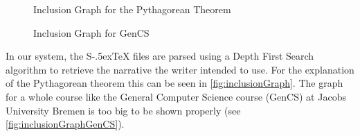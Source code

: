 \documentclass[twoside, 12pt]{article}
\def\stex{\texorpdfstring{\raisebox{-.5ex}S\kern-.5ex\TeX}{sTeX}\xspace}
\begin{document}
\begin{figure}
\vspace{-0pt}
  \begin{center}
\vspace{-8pt}
  \caption{Inclusion Graph for the Pythagorean Theorem}
  \label{fig:inclusionGraph}
\vspace{12pt}
  \end{center}
\end{figure}

\begin{figure}
\vspace{-28pt}
  \begin{center}
\vspace{-20pt}
  \caption{Inclusion Graph for GenCS}
  \label{fig:inclusionGraphGenCS}
\vspace{-24pt}
  \end{center}
\end{figure}

In our system, the \stex files are parsed using a Depth First Search algorithm to retrieve the narrative the writer intended to use. For the explanation of the Pythagorean theorem this can be seen in \autoref{fig:inclusionGraph}. The graph for a whole course like the General Computer Science course (GenCS) at Jacobs University Bremen \cite{Kohlhase:GenCSII:base} is too big to be shown properly (see \autoref{fig:inclusionGraphGenCS}).\\
\end{document}
